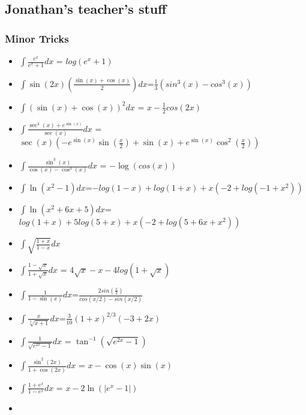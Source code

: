 \hypertarget{jonathans-teachers-stuff}{%
\subsection{Jonathan's teacher's stuff}\label{jonathans-teachers-stuff}}

\hypertarget{minor-tricks}{%
\subsubsection{Minor Tricks}\label{minor-tricks}}

\begin{itemize}
\tightlist
\item
  \(\displaystyle\int \frac{e^x}{e^x+1}dx\) = \(log({e^x+1})\)
\item
  \(\displaystyle\int \sin(2x) \left(\frac{\sin(x)+\cos(x)}{2} \right)dx\)=\(\frac{1}3({sin^3(x)-cos^3(x)})\)
\item
  \(\displaystyle\int (\sin(x) + \cos(x))^2dx\) =
  \(x-\frac{1}{2}cos(2x)\)
\item
  \(\displaystyle\int \frac{\sec^3(x) + e^{\sin(x)}}{\sec(x)}dx\) =
  \(\sec(x)(-e^{\sin(x)}\sin(\frac{x}{2})+\sin(x)+e^{\sin(x)}\cos^2(\frac{x}{2}))\)
\item
  \(\displaystyle\int \frac{\sin^3(x)}{\cos(x) - \cos^3(x)}dx\) =
  \(- \log(cos(x))\)
\item
  \(\displaystyle\int \ln(x^2-1)dx\)=\(-log(1 - x) + log(1 + x) + x (-2 + log(-1 + x^2))\)
\item
  \(\displaystyle\int \ln(x^2 + 6x + 5)dx\)=\(log(1 + x) + 5 log(5 + x) + x (-2 + log(5 + 6 x + x^2))\)
\item
  \(\displaystyle\int \sqrt{\frac{1+x}{1-x}}dx\)
\item
  \(\displaystyle\int \frac{1- \sqrt{x}}{1 + \sqrt{x}}dx\) =
  \(4\sqrt{x}- x - 4 log(1 + \sqrt{x})\)
\item
  \(\displaystyle\int \frac{1}{1-\sin(x)}dx\)=\(\frac{2sin(\frac{x}{2})}{cos(x/2) - sin(x/2)}\)
\item
  \(\displaystyle\int \frac{x}{\sqrt[3]{x+1}}dx\)=\(\frac{3}{10}(1 + x)^{2/3}(-3+2x)\)
\item
  \(\displaystyle\int \frac{1}{\sqrt{e^{2x}-1}}dx\) =
  \(\tan^{-1}(\sqrt{e^{2x}-1})\)
\item
  \(\displaystyle\int \frac{\sin^2(2x)}{1+\cos(2x)}dx\) =
  \(x-\cos(x)\sin(x)\)
\item
  \(\displaystyle\int \frac{1+e^x}{1-e^x}dx\) = \(x-2\ln(|e^x-1|)\)
\item

\end{itemize}
